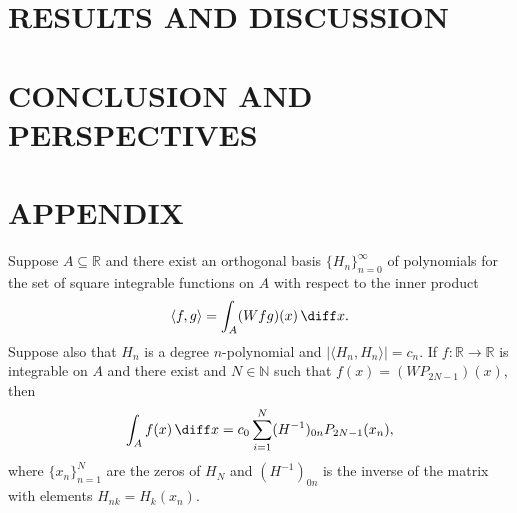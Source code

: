 \documentclass[11pt,english,a4paper]{article}
\begin{document}
\section*{\uppercase{Results and discussion}}

\section*{\uppercase{Conclusion and perspectives}}

\section*{\uppercase{Appendix}}
\begin{theorem}
Suppose $A \subseteq \mathbb{R}$ and there exist an orthogonal basis $\{H_n\}_{n=0}^\infty$ of polynomials for the set of square integrable functions on $A$ with respect to the inner product
\[
\langle f,g\rangle = \int_A (Wfg)(x)\, \diff x.
\]
Suppose also that $H_n$ is a degree $n$-polynomial and $|\langle H_n,H_n \rangle| = c_n$. If $f: \mathbb{R} \to \mathbb{R}$ is integrable on $A$ and there exist and $N \in \mathbb{N}$ such that $f(x) = (WP_{2N-1})(x)$, then 
\[
\int_A f(x)\, \diff x = c_0 \sum_{i=1}^N (H^{-1})_{0n} P_{2N-1}(x_n),
\]
where $\{x_n\}_{n=1}^N$ are the zeros of $H_N$ and $(H^{-1})_{0n}$ is the inverse of the matrix with elements $H_{nk} = H_k(x_n)$.
\end{theorem}
\end{document}

